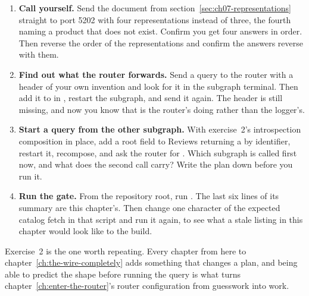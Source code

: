 \begin{enumerate}
  \item \textbf{Call  yourself.} Send the document from
  section~\ref{sec:ch07-representations} straight to port 5202 with four
  representations instead of three, the fourth naming a product that does not
  exist. Confirm you get four answers in order. Then reverse the order of the
  representations and confirm the answers reverse with them.

  \item \textbf{Find out what the router forwards.} Send a query to the router
  with a header of your own invention and look for it in the subgraph terminal.
  Then add it to  in
  , restart the subgraph, and send
  it again. The header is still missing, and now you know that is the router's
  doing rather than the logger's.

  \item \textbf{Start a query from the other subgraph.} With exercise~2's
  introspection composition in place, add a root field to Reviews returning a
   by identifier, restart it, recompose, and ask the router for
  . Which subgraph is called
  first now, and what does the second call carry? Write the plan down before you
  run it.

  \item \textbf{Run the gate.} From the repository root, run
  . The last six lines of its summary are this
  chapter's. Then change one character of the expected catalog fetch in that
  script and run it again, to see what a stale listing in this chapter would
  look like to the build.
\end{enumerate}

Exercise~2 is the one worth repeating. Every chapter from here to
chapter~\ref{ch:the-wire-completely} adds something that changes a plan, and
being able to predict the shape before running the query is what turns
chapter~\ref{ch:enter-the-router}'s router configuration from guesswork into
work.
